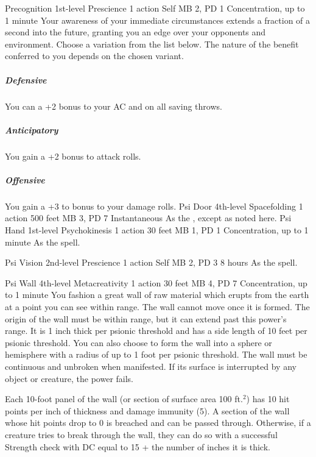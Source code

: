 \DndPowerHeader%
    {Precognition\label{pwr:precognition}}
    {1st-level Prescience}
    {1 action}
    {Self}
    {MB 2, PD 1}
    {Concentration, up to 1 minute}
Your awareness of your immediate circumstances extends
a fraction of a second into the future,
granting you an edge over your opponents and environment.
Choose a variation from the list below.
The nature of the benefit conferred to you
depends on the chosen variant.
\subparagraph{Defensive}
  You can a +2 bonus to your AC and on all saving throws.
\subparagraph{Anticipatory}
  You gain a +2 bonus to attack rolls.
\subparagraph{Offensive}
  You gain a +3 to bonus to your damage rolls.
\DndPowerHeader%
    {Psi Door\label{pwr:psi_door}}
    {4th-level Spacefolding}
    {1 action}
    {500 feet}
    {MB 3, PD 7}
    {Instantaneous}
As the , except as
noted here.
\DndPowerHeader%
    {Psi Hand\label{pwr:psi_hand}}
    {1st-level Psychokinesis}
    {1 action}
    {30 feet}
    {MB 1, PD 1}
    {Concentration, up to 1 minute}
As the  spell.

\DndPowerHeader%
    {Psi Vision\label{pwr:psi_vision}}
    {2nd-level Prescience}
    {1 action}
    {Self}
    {MB 2, PD 3}
    {8 hours}
As the  spell.

\DndPowerHeader%
    {Psi Wall\label{pwr:psi_wall}}
    {4th-level Metacreativity}
    {1 action}
    {30 feet}
    {MB 4, PD 7}
    {Concentration, up to 1 minute}
You fashion a great wall of raw material
which erupts from the earth at a point you can see within
range. The wall cannot move once it is formed. The origin
of the wall must be within range, but it can extend past this
power's range. It is 1 inch thick per psionic threshold and
has a side length of 10 feet per psionic threshold. You can
also choose to form the wall into a sphere or hemisphere with
a radius of up to 1 foot per psionic threshold. The wall must
be continuous and unbroken when manifested. If its surface
is interrupted by any object or creature, the power fails.

Each 10-foot panel of the wall (or section of surface area
100 ft.$^2$) has 10 hit points per inch of thickness and damage
immunity (5). A section of the wall whose hit points drop
to 0 is breached and can be passed through. Otherwise, if
a creature tries to break through the wall, they can do so
with a successful Strength check with DC equal to 15 + the
number of inches it is thick.

